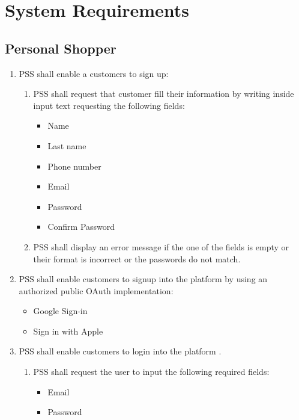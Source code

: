 \section{System Requirements}

\subsection{Personal Shopper}
\begin{enumerate}[label=SY-\arabic*]
    \item PSS shall enable a customers to sign up:
    \begin{enumerate}[label=SY-1.\arabic*]
        \item PSS shall request that customer fill their information by
        writing inside input text requesting the following fields:
        \begin{itemize}
            \item Name
            \item Last name
            \item Phone number
            \item Email
            \item Password
            \item Confirm Password
        \end{itemize}
        \item PSS shall display an error message if the one of the fields is 
        empty or their format is incorrect or the passwords do not match.
    \end{enumerate}
    \item PSS shall enable customers to signup into the platform by using an 
    authorized public OAuth implementation:
    \begin{itemize}
        \item Google Sign-in \cite{google-sign-in}
        \item Sign in with Apple \cite{sign-in-with-apple}
    \end{itemize}
    \item PSS shall enable customers to login into the platform .
    \begin{enumerate}[label=SY-3.\arabic*]
        \item PSS shall request the user to input the following required 
        fields:
        \begin{itemize}
            \item Email
            \item Password

\end{itemize}
\end{enumerate}
\end{enumerate}
